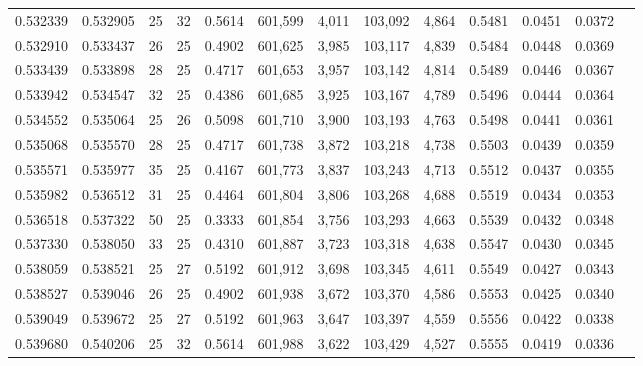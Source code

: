 \begin{tabular}{rrrrrrrrrrrrr}
0.532339 & 0.532905 &    25 &  32 &                                     0.5614 & 601,599 &   4,011 & 103,092 &   4,864 & 0.5481 & 0.0451 & 0.0372 \\
0.532910 & 0.533437 &    26 &  25 &                                     0.4902 & 601,625 &   3,985 & 103,117 &   4,839 & 0.5484 & 0.0448 & 0.0369 \\
0.533439 & 0.533898 &    28 &  25 &                                     0.4717 & 601,653 &   3,957 & 103,142 &   4,814 & 0.5489 & 0.0446 & 0.0367 \\
0.533942 & 0.534547 &    32 &  25 &                                     0.4386 & 601,685 &   3,925 & 103,167 &   4,789 & 0.5496 & 0.0444 & 0.0364 \\
0.534552 & 0.535064 &    25 &  26 &                                     0.5098 & 601,710 &   3,900 & 103,193 &   4,763 & 0.5498 & 0.0441 & 0.0361 \\
0.535068 & 0.535570 &    28 &  25 &                                     0.4717 & 601,738 &   3,872 & 103,218 &   4,738 & 0.5503 & 0.0439 & 0.0359 \\
0.535571 & 0.535977 &    35 &  25 &                                     0.4167 & 601,773 &   3,837 & 103,243 &   4,713 & 0.5512 & 0.0437 & 0.0355 \\
0.535982 & 0.536512 &    31 &  25 &                                     0.4464 & 601,804 &   3,806 & 103,268 &   4,688 & 0.5519 & 0.0434 & 0.0353 \\
0.536518 & 0.537322 &    50 &  25 &                                     0.3333 & 601,854 &   3,756 & 103,293 &   4,663 & 0.5539 & 0.0432 & 0.0348 \\
0.537330 & 0.538050 &    33 &  25 &                                     0.4310 & 601,887 &   3,723 & 103,318 &   4,638 & 0.5547 & 0.0430 & 0.0345 \\
0.538059 & 0.538521 &    25 &  27 &                                     0.5192 & 601,912 &   3,698 & 103,345 &   4,611 & 0.5549 & 0.0427 & 0.0343 \\
0.538527 & 0.539046 &    26 &  25 &                                     0.4902 & 601,938 &   3,672 & 103,370 &   4,586 & 0.5553 & 0.0425 & 0.0340 \\
0.539049 & 0.539672 &    25 &  27 &                                     0.5192 & 601,963 &   3,647 & 103,397 &   4,559 & 0.5556 & 0.0422 & 0.0338 \\
0.539680 & 0.540206 &    25 &  32 &                                     0.5614 & 601,988 &   3,622 & 103,429 &   4,527 & 0.5555 & 0.0419 & 0.0336 \\

\end{tabular}
